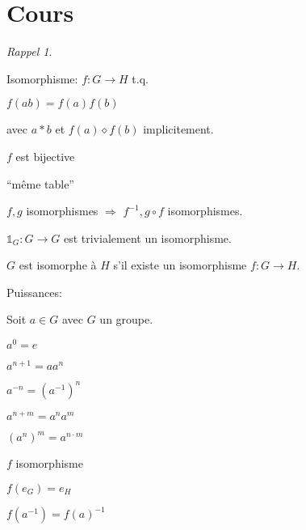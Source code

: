 \documentclass{report}
\newcounter{cours}
\newcommand*{\cours}{\section*{Cours \thecours}\stepcounter{cours}}
\theoremstyle{definition}
\theoremstyle{remark}
\newtheorem*{rappel}{Rappel}
\begin{document}
	\cours
	\begin{rappel}
		~

		\begin{ulist}[noitemsep]
			\item Isomorphisme: $f:G \to H$ t.q.
			\begin{nlist}
				\item $f(ab)=f(a)f(b)$

				avec $a *b$ et $f(a) \diamond f(b)$ implicitement.
				\item $f$ est bijective
			\end{nlist}
			``m\^eme table''
			\item $f,g$ isomorphismes $\Rightarrow$ $f^{-1}, g \circ f$ isomorphismes.

			$\mathds{1}_G:G \to G$ est trivialement un isomorphisme.
			\item $G$ est isomorphe \`a $H$ s'il existe un isomorphisme $f:G \to H$.
			\item Puissances:

			Soit $a \in G$ avec $G$ un groupe.
			\begin{ulist}
				\item $a^0=e$
				\item $a^{n+1}=aa^n$
				\item $a^{-n}=(a^{-1})^n$
				\item $a^{n+m}=a^na^m$
				\item $(a^n)^m=a^{n \cdot m}$
			\end{ulist}
			\item $f$ isomorphisme
			\begin{ulist}
				\item $f(e_G)=e_H$
				\item $f(a^{-1})=f(a)^{-1}$
			\end{ulist}
		\end{ulist}
	\end{rappel}
\end{document}
